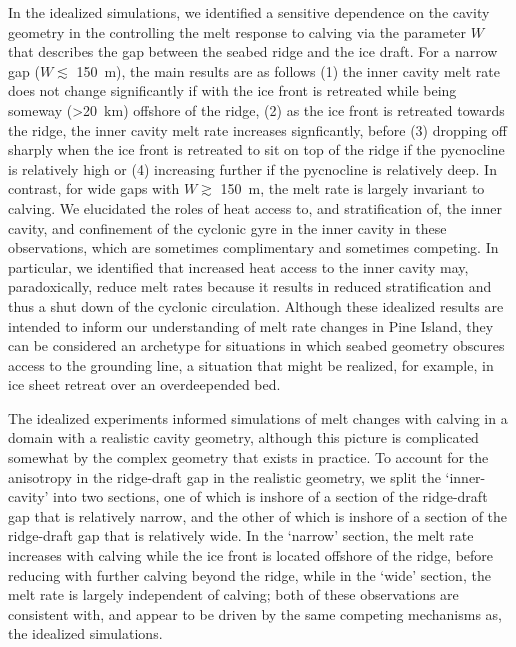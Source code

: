 \documentclass[draft]{agujournal2019}
\begin{document}
In the idealized simulations, we identified a sensitive dependence on the cavity geometry in the controlling the melt response to calving via the parameter $W$ that describes the gap between the seabed ridge and the ice draft. For a narrow gap ($W \lesssim$ 150~m), the main results are as follows (1) the inner cavity melt rate does not change significantly if with the ice front is retreated while being someway (>20~km) offshore of the ridge, (2) as the ice front is retreated towards the ridge, the inner cavity melt rate increases signficantly, before (3) dropping off sharply when the ice front is retreated to sit on top of the ridge if the pycnocline is relatively high or (4) increasing further if the pycnocline is relatively deep. In contrast, for wide gaps with $W \gtrsim$ 150~m, the melt rate is largely invariant to calving. We elucidated the roles of heat access to, and stratification of, the inner cavity, and confinement of the cyclonic gyre in the inner cavity in these observations, which are sometimes complimentary and sometimes competing. In particular, we identified that increased heat access to the inner cavity may, paradoxically, reduce melt rates because it results in reduced stratification and thus a shut down of the cyclonic circulation. Although these idealized results are intended to inform our understanding of melt rate changes in Pine Island, they can be considered an archetype for situations in which seabed geometry obscures access to the grounding line, a situation that might be realized, for example, in ice sheet retreat over an overdeepended bed. 

The idealized experiments informed simulations of melt changes with calving in a domain with a realistic cavity geometry, although this picture is complicated somewhat by the complex geometry that exists in practice. To account for the anisotropy in the ridge-draft gap in the realistic geometry, we split the `inner-cavity' into two sections, one of which is inshore of a section of the ridge-draft gap that is relatively narrow, and the other of which is inshore of a section of the ridge-draft gap that is relatively wide. In the `narrow' section, the melt rate increases with calving while the ice front is located offshore of the ridge, before reducing with further calving beyond the ridge, while in the `wide' section, the melt rate is largely independent of calving; both of these observations are consistent with, and appear to be driven by the same competing mechanisms as, the idealized simulations.
\end{document}
